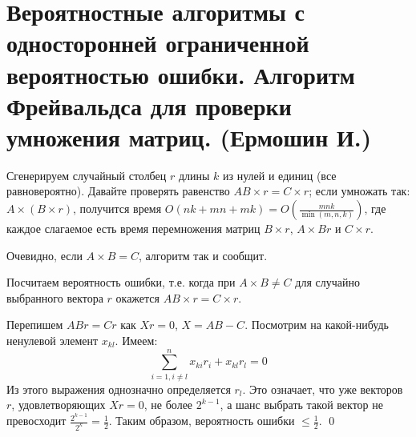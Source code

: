 \hypertarget{Freivalds}{}
\section{Вероятностные алгоритмы с односторонней ограниченной вероятностью ошибки. Алгоритм Фрейвальдса для проверки умножения матриц. (Ермошин И.)}





Сгенерируем случайный столбец $r$ длины $k$ из нулей и единиц (все равновероятно). Давайте проверять равенство $AB\times r=C\times r$; если умножать так: $A\times (B\times r)$, получится время $O(nk+mn+mk)=O\left(\frac{mnk}{\min(m,n,k)}\right)$, где каждое слагаемое есть время перемножения матриц $B\times r$, $A \times Br$ и $C\times r$.


Очевидно, если $A\times B=C$, алгоритм так и сообщит.

Посчитаем вероятность ошибки, т.е. когда при $A\times B \neq C$ для случайно выбранного вектора $r$ окажется $AB\times r = C\times r$.

Перепишем $ABr = Cr$ как $Xr=0$, $X=AB-C$. Посмотрим на какой-нибудь ненулевой элемент $x_{kl}$. Имеем:
$$\sum_{i=1, i\ne l}^{n} x_{ki}r_i+x_{kl}r_l=0$$
Из этого выражения однозначно определяется $r_l$. Это означает, что уже векторов $r$, удовлетворяющих $Xr=0$, не более $2^{k-1}$, а шанс выбрать такой вектор не превосходит $\frac{2^{k-1}}{2^k} = \frac{1}{2}$. Таким образом, вероятность ошибки $\le\frac{1}{2}$. \qed